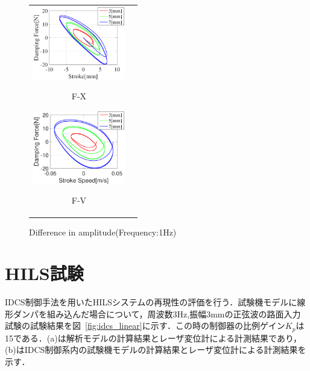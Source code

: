 \documentclass{article_vdlab_sotsuron_youshi}
\begin{document}
\vspace*{3mm}
\begin{figure}[h]
  \begin{tabular}{cc}
  \begin{minipage}{0.5\hsize}
  \begin{center}
    \includegraphics[height=32mm]{figure/damper_fx.eps}
    \end{center}
    \begin{center}
      \vspace{-3mm}
    \ F-X\
    \end{center}
  \end{minipage}
  \begin{minipage}{0.5\hsize}
     \begin{center}
      \includegraphics[height=32mm]{figure/damper_fv.eps}
      \end{center}
      \begin{center}
        \vspace{-3mm}
      \ F-V\
    \end{center}
  \end{minipage}
  \end{tabular}
  \caption{Difference in amplitude(Frequency:1Hz)}
    \label{fig:damper}
\end{figure}

\newpage
\section{HILS試験}

IDCS制御手法を用いたHILSシステムの再現性の評価を行う．試験機モデルに線形ダンパを組み込んだ場合について，周波数3Hz,振幅3mmの正弦波の路面入力試験の試験結果を図~\ref{fig:idcs_linear}に示す．この時の制御器の比例ゲイン$K_p$は15である．(a)は解析モデルの計算結果とレーザ変位計による計測結果であり，(b)はIDCS制御系内の試験機モデルの計算結果とレーザ変位計による計測結果を示す．
\end{document}

